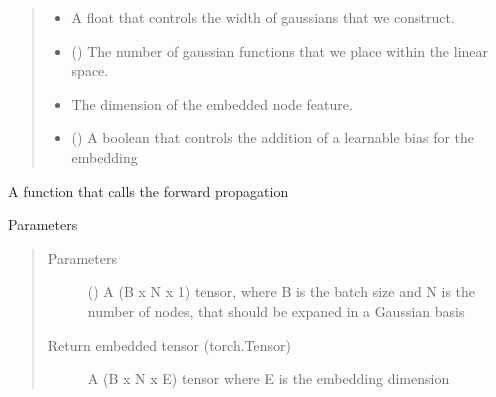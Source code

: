 \documentclass[letterpaper,10pt,english]{sphinxmanual}
\begin{document}
\begin{fulllineitems}
\begin{quote}
\begin{description}
\begin{itemize}
\item {} 
\sphinxstyleliteralstrong{\sphinxupquote{(}}\sphinxstyleliteralstrong{\sphinxupquote{)}} \textendash{} A float that controls the width of gaussians that we construct.

\item {} 
\sphinxstyleliteralstrong{\sphinxupquote{(}}\sphinxstyleliteralstrong{\sphinxupquote{)}} () \textendash{} The number of gaussian functions that we place within the linear space.

\item {} 
\sphinxstyleliteralstrong{\sphinxupquote{(}}\sphinxstyleliteralstrong{\sphinxupquote{)}} \textendash{} The dimension of the embedded node feature.

\item {} 
\sphinxstyleliteralstrong{\sphinxupquote{ (}}\sphinxstyleliteralstrong{\sphinxupquote{)}} (\sphinxstyleliteralemphasis{\sphinxupquote{(}}\sphinxstyleliteralemphasis{\sphinxupquote{)}}) \textendash{} A boolean that controls the addition of a learnable bias for the embedding

\end{itemize}

\end{description}\end{quote}

\begin{fulllineitems}
\label{\detokenize{modules/gqcml.nn:gqcml.nn.layers.GaussianEmbedding.forward}}
A function that calls the forward propagation

Parameters
\begin{quote}\begin{description}
\item[{Parameters}] \leavevmode
\sphinxstyleliteralstrong{\sphinxupquote{(}} () \textendash{} A (B x N x 1) tensor, where B is the batch size and N is the number of nodes,
that should be expaned in a Gaussian basis

\item[{Return embedded tensor (torch.Tensor)}] \leavevmode
A (B x N x E) tensor where E is the embedding dimension

\end{description}\end{quote}

\end{fulllineitems}


\end{fulllineitems}
\end{document}
